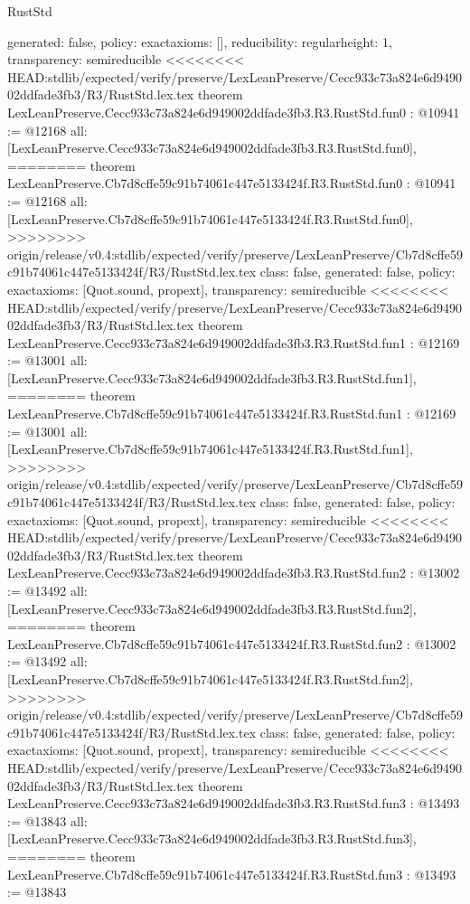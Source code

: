 \begin{lexlean}{RustStd}
\begin{coremodule}
{\begin{coremodule}
{{{  generated: false,
  policy: exact{axioms: []},
  reducibility: regular{height: 1},
  transparency: semireducible
}
<<<<<<<< HEAD:stdlib/expected/verify/preserve/LexLeanPreserve/Cecc933c73a824e6d949002ddfade3fb3/R3/RustStd.lex.tex
theorem LexLeanPreserve.Cecc933c73a824e6d949002ddfade3fb3.R3.RustStd.fun0 : @10941 := @12168 {
  all: [LexLeanPreserve.Cecc933c73a824e6d949002ddfade3fb3.R3.RustStd.fun0],
========
theorem LexLeanPreserve.Cb7d8cffe59c91b74061c447e5133424f.R3.RustStd.fun0 : @10941 := @12168 {
  all: [LexLeanPreserve.Cb7d8cffe59c91b74061c447e5133424f.R3.RustStd.fun0],
>>>>>>>> origin/release/v0.4:stdlib/expected/verify/preserve/LexLeanPreserve/Cb7d8cffe59c91b74061c447e5133424f/R3/RustStd.lex.tex
  class: false,
  generated: false,
  policy: exact{axioms: [Quot.sound, propext]},
  transparency: semireducible
}
<<<<<<<< HEAD:stdlib/expected/verify/preserve/LexLeanPreserve/Cecc933c73a824e6d949002ddfade3fb3/R3/RustStd.lex.tex
theorem LexLeanPreserve.Cecc933c73a824e6d949002ddfade3fb3.R3.RustStd.fun1 : @12169 := @13001 {
  all: [LexLeanPreserve.Cecc933c73a824e6d949002ddfade3fb3.R3.RustStd.fun1],
========
theorem LexLeanPreserve.Cb7d8cffe59c91b74061c447e5133424f.R3.RustStd.fun1 : @12169 := @13001 {
  all: [LexLeanPreserve.Cb7d8cffe59c91b74061c447e5133424f.R3.RustStd.fun1],
>>>>>>>> origin/release/v0.4:stdlib/expected/verify/preserve/LexLeanPreserve/Cb7d8cffe59c91b74061c447e5133424f/R3/RustStd.lex.tex
  class: false,
  generated: false,
  policy: exact{axioms: [Quot.sound, propext]},
  transparency: semireducible
}
<<<<<<<< HEAD:stdlib/expected/verify/preserve/LexLeanPreserve/Cecc933c73a824e6d949002ddfade3fb3/R3/RustStd.lex.tex
theorem LexLeanPreserve.Cecc933c73a824e6d949002ddfade3fb3.R3.RustStd.fun2 : @13002 := @13492 {
  all: [LexLeanPreserve.Cecc933c73a824e6d949002ddfade3fb3.R3.RustStd.fun2],
========
theorem LexLeanPreserve.Cb7d8cffe59c91b74061c447e5133424f.R3.RustStd.fun2 : @13002 := @13492 {
  all: [LexLeanPreserve.Cb7d8cffe59c91b74061c447e5133424f.R3.RustStd.fun2],
>>>>>>>> origin/release/v0.4:stdlib/expected/verify/preserve/LexLeanPreserve/Cb7d8cffe59c91b74061c447e5133424f/R3/RustStd.lex.tex
  class: false,
  generated: false,
  policy: exact{axioms: [Quot.sound, propext]},
  transparency: semireducible
}
<<<<<<<< HEAD:stdlib/expected/verify/preserve/LexLeanPreserve/Cecc933c73a824e6d949002ddfade3fb3/R3/RustStd.lex.tex
theorem LexLeanPreserve.Cecc933c73a824e6d949002ddfade3fb3.R3.RustStd.fun3 : @13493 := @13843 {
  all: [LexLeanPreserve.Cecc933c73a824e6d949002ddfade3fb3.R3.RustStd.fun3],
========
theorem LexLeanPreserve.Cb7d8cffe59c91b74061c447e5133424f.R3.RustStd.fun3 : @13493 := @13843 {
}}}}}}}
\end{coremodule}}
\end{coremodule}
\end{lexlean}
